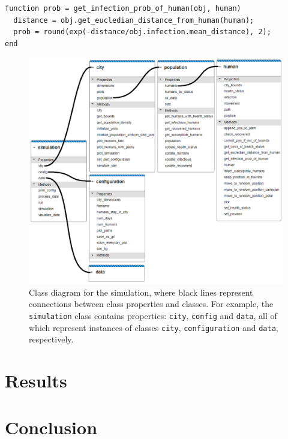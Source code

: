 \documentclass[a4paper]{article}
\newcommand{\code}{\texttt}
\begin{document}
\begin{lstlisting}[caption={Function for getting the probability of infection between an infectious human and a susceptible human, where \code{obj} is \code{human} - specifically, an instance of \code{human} whose health status is infectious.}, captionpos=b, label={code:get-infection-prob-of-human}]
function prob = get_infection_prob_of_human(obj, human)		
  distance = obj.get_eucledian_distance_from_human(human);
  prob = round(exp(-distance/obj.infection.mean_distance), 2);
end
\end{lstlisting}

\begin{figure}[h!]
	\centering
	\includegraphics[scale=0.65]{images/simulation_class_diagram.png}
	\caption{Class diagram for the simulation, where black lines represent connections between class properties and classes. For example, the \code{simulation} class contains properties: \code{city}, \code{config} and \code{data}, all of which represent instances of classes \code{city}, \code{configuration} and \code{data}, respectively.}
	\label{figure:simulation-class-diagram}
\end{figure}




\section{Results}\label{section:results}




\section{Conclusion}\label{section:conclusion}





 
\end{document}
